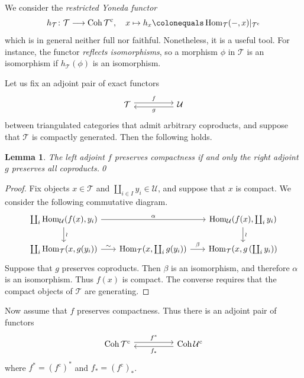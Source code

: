 \documentclass{amsart}[a4]
\newtheorem{lemma}[theorem]{Lemma}
\theoremstyle{definition}
\theoremstyle{remark}
\numberwithin{equation}{section}
\newcommand{\Coh}{\operatorname{Coh}}
\newcommand{\Hom}{\operatorname{Hom}}
\newcommand{\lto}{\longrightarrow}
\newcommand{\cat}{\mathcal}
\begin{document}
  
We consider the \emph{restricted Yoneda functor}
\[h_\cat T\colon\cat T\lto\Coh\cat T^{\mathrm c},\quad x\mapsto h_x\colonequals\Hom_\cat
  T(-,x)|_{\cat T^{\mathrm c}}\] which is in general neither full nor
faithful. Nonetheless, it is a useful tool. For instance, the functor
\emph{reflects isomorphisms}, so a morphism $\phi$ in $\cat T$ is an
isomorphism if $h_\cat T(\phi)$ is an isomorphism.

Let us fix an adjoint pair of exact functors 
\begin{equation*}
\begin{tikzcd}
\cat T \ar[rr,yshift=2.5,"f"] &&  \ar[ll,yshift=-2.5,"g"]
\cat U
\end{tikzcd}
\end{equation*}
between triangulated categories that admit arbitrary coproducts, and
suppose that $\cat T$ is compactly generated. Then the following
holds.

\begin{lemma}\label{le:comp-gen-adjoints}
  The left adjoint $f$ preserves compactness if and only the right
  adjoint $g$ preserves all coproducts.\qed
\end{lemma}
\begin{proof}
  Fix objects $x\in\cat T$ and $\coprod_{i\in I}y_i\in\cat U$, and suppose that $x$ is
  compact.  We consider the following commutative diagram.
  \[\begin{tikzcd}[column sep = scriptsize]
      \coprod_i\Hom_\cat U(f(x),y_i)
      \arrow{rr}{\alpha}\arrow{d}{\wr}&&\Hom_\cat U(f(x),\coprod_i y_i) \arrow{d}{\wr}\\
      \coprod_i\Hom_\cat T(x,g(y_i)) \arrow{r}{\sim}&\Hom_\cat T(x,\coprod_i
      g(y_i))\arrow{r}{\beta}&\Hom_\cat T(x,g\left(\coprod_i y_i\right))
    \end{tikzcd}\]
  Suppose that $g$ preserves coproducts. Then $\beta$ is an isomorphism,
  and therefore $\alpha$ is an isomorphism. Thus $f(x)$ is compact. The
  converse requires that the compact objects of $\cat T$ are generating.
\end{proof}


Now assume that $f$ preserves compactness. Thus there is an adjoint
pair of functors
\begin{equation*}
\begin{tikzcd}
\Coh\cat T^{\mathrm c} \ar[rr,yshift=2.5,"f^*"] &&  \ar[ll,yshift=-2.5,"f_*"]
\Coh\cat U^{\mathrm c}
\end{tikzcd}
\end{equation*}
where $f^*=(f^{\mathrm c})^*$ and $f_*=(f^{\mathrm c})_*$.
\end{document}
